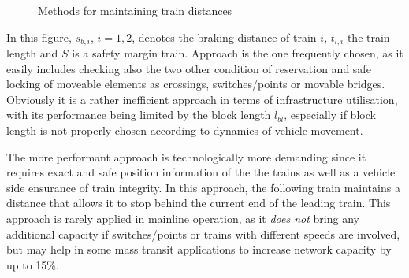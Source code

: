 \documentclass[a4paper, 12pt]{scrartcl}
\begin{document}
\begin{figure}
\begin{center}
\label{fig:AbsSpacDist}
\end{center}
\caption{Methods for maintaining train distances}
\label{fig:DistanceKeeping}
\end{figure}

In this figure, $s_{b,i}$, $i = 1,2$, denotes the braking distance of train $i$, $t_{l, i}$ the train length and $S$ is a safety margin train. Approach  is the one frequently chosen, as it easily includes checking also the two other condition of reservation and safe locking of moveable elements as crossings, switches/points or movable bridges.
Obviously it is a rather inefficient approach in terms of infrastructure utilisation, with its performance being limited by the block length $l_{bl}$, especially if block length is not properly chosen according to dynamics of vehicle movement. 

The more performant approach  is technologically more demanding since it requires exact and safe position information of the the trains as well as a vehicle side ensurance of train integrity. In this approach, the following train maintains a distance that allows it to stop behind the current end of the leading train. This approach is rarely applied in mainline operation, as it \emph{does not} bring any additional capacity if switches/points or trains with different speeds are involved, but may help in some mass transit applications to increase network capacity \cite{pachl2011systemtechnik} by up to 15\%. 
\end{document}
